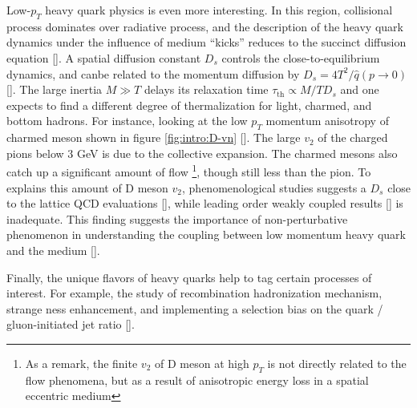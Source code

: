 Low-$p_T$ heavy quark physics is even more interesting.
In this region, collisional process dominates over radiative process, and the description of the heavy quark dynamics under the influence of medium ``kicks'' reduces to the succinct diffusion equation [].
A spatial diffusion constant $D_s$ controls the close-to-equilibrium dynamics, and canbe related to the momentum diffusion by $D_s = 4T^2/\hat{q}(p\rightarrow 0)$ [].
The large inertia $M\gg T$ delays its relaxation time $\tau_{\textrm{th}} \propto M/T D_s$ and one expects to find a different degree of thermalization for light, charmed, and bottom hadrons.
For instance, looking at the low $p_T$ momentum anisotropy of charmed meson shown in figure \ref{fig:intro:D-vn} [].
The large $v_2$ of the charged pions below $3$ GeV is due to the collective expansion.
The charmed mesons also catch up a significant amount of flow \footnote{As a remark, the finite $v_2$ of D meson at high $p_T$ is not directly related to the flow phenomena, but as a result of anisotropic energy loss in a spatial eccentric medium}, though still less than the pion.
To explains this amount of D meson $v_2$, phenomenological studies suggests a $D_s$ close to the lattice QCD evaluations [], while leading order weakly coupled results [] is inadequate. 
This finding suggests the importance of non-perturbative phenomenon in understanding the coupling between low momentum heavy quark and the medium [].

Finally, the unique flavors of heavy quarks help to tag certain processes of interest. 
For example, the study of recombination hadronization mechanism, strange ness enhancement, and implementing a selection bias on the quark / gluon-initiated jet ratio [].

